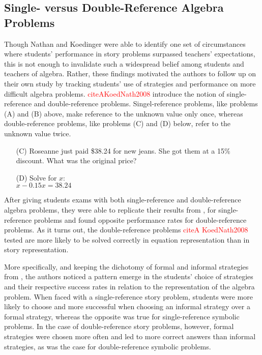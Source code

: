 \documentclass[10pt,letterpaper]{article}
\newcommand\TODO[1]{\textcolor{red}{#1}}
\begin{document}
\subsection{Single- versus Double-Reference Algebra Problems}

Though Nathan and Koedinger were able to identify one set of circumstances where students' performance in story problems surpassed teachers' expectations, this is not enough to invalidate such a widespread belief among students and teachers of algebra. Rather, these findings motivated the authors to follow up on their own study by tracking students' use of strategies and performance on more difficult algebra problems. \TODO{citeA{KoedNath2008}}  introduce the notion of single-reference and double-reference problems. Singel-reference problems, like problems (A) and (B) above, make reference to the unknown value only once, whereas double-reference problems, like problems (C) and (D) below, refer to the unknown value twice.

\begin{enumerate}
	\item[(C)] Roseanne just paid \$38.24 for new jeans. She got them at a 15\% discount. What was the original price?
	
	\item[(D)] Solve for $x$:\\$x - 0.15x = 38.24$
\end{enumerate}

After giving students exams with both single-reference and double-reference algebra problems, they were able to replicate their results from \cite{KoedNath2004}, for single-reference problems and found opposite performance rates for double-reference problems. As it turns out, the double-reference problems \TODO{citeA KoedNath2008} tested are more likely to be solved correctly in equation representation than in story representation. 

More specifically, and keeping the dichotomy of formal and informal strategies from , the authors noticed a pattern emerge in the students' choice of strategies and their respective success rates in relation to the representation of the algebra problem. When faced with a single-reference story problem, students were more likely to choose and more successful when choosing an informal strategy over a formal strategy, whereas the opposite was true for single-reference symbolic problems. In the case of double-reference story problems, however, formal strategies were chosen more often and led to more correct answers than informal strategies, as was the case for double-reference symbolic problems. 
\end{document}
